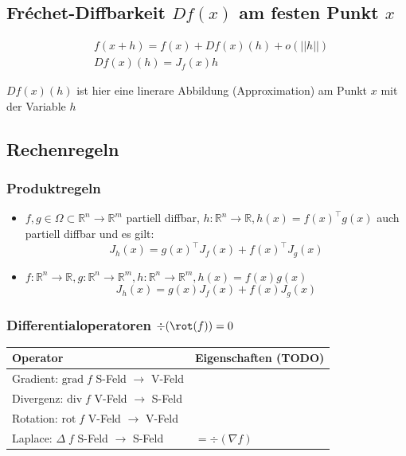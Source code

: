 \subsection{Fréchet-Diffbarkeit $Df(x)$ am festen Punkt $x$}
\begin{equation*}
    \begin{split}
         & f(x+h)=f(x)+Df(x)(h) + o(||h||) \\
         & Df(x)(h)=J_f(x)h
    \end{split}
\end{equation*}


$Df(x)(h)$ ist hier eine linerare Abbildung (Approximation) am Punkt $x$ mit der Variable $h$

\subsection{Rechenregeln}
\subsubsection{Produktregeln}
\begin{itemize}
    \item $f,g \in \Omega \subset \mathbb R^n \rightarrow \mathbb R^m$ partiell diffbar, $h: \mathbb R^n \rightarrow \mathbb R, h(x) = f(x)^\top g(x)$ auch partiell diffbar und es gilt:
        \begin{equation*}
            J_h(x)=g(x)^\top J_f(x)+f(x)^\top J_g(x)
        \end{equation*}
    \item $f:\mathbb R^n \rightarrow \mathbb R, g:\mathbb R^n \rightarrow \mathbb R^m, h:\mathbb R^n \rightarrow \mathbb R^m, h(x)=f(x)g(x)$
        \begin{equation*}
            J_h(x)=g(x)J_f(x)+f(x)J_g(x)
        \end{equation*}
\end{itemize}



\subsubsection{Differentialoperatoren \qquad $\div(\rot(f)) = 0$}
\begin{tabular}{l|l}
    Operator & Eigenschaften (TODO)             \\ \midrule
    \pbox{3.0cm}{ Gradient: $\mathrm{grad}\; f$ \\ S-Feld $\rightarrow$ V-Feld } & \\  \midrule
    \pbox{3.0cm}{ Divergenz: $\mathrm{div}\; f$ \\ V-Feld $\rightarrow$ S-Feld } & \\  \midrule
    \pbox{3.0cm}{ Rotation: $\mathrm{rot}\; f$  \\ V-Feld $\rightarrow$ V-Feld } &  \\ \midrule
    \pbox{3.0cm}{ Laplace: $\Delta\; f$         \\ S-Feld $\rightarrow$ S-Feld } & $=\div(\nabla f)$
\end{tabular}

